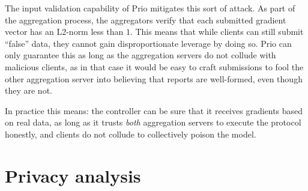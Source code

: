 \documentclass{article}
\begin{document}
The input validation capability of Prio mitigates this sort of attack.
As part of the aggregation process, the aggregators verify that each submitted gradient vector
has an L2-norm less than $1$. This means that while clients can still submit
``false'' data, they cannot gain disproportionate leverage by doing so. Prio can only
guarantee this as long as the aggregation servers do not collude with malicious
clients, as in that case it would be easy to craft submissions to fool the other
aggregation server into believing that reports are well-formed, even though they
are not.

In practice this means: the controller can be sure that it receives gradients
based on real data, as long as it trusts \textit{both} aggregation servers to
execute the protocol honestly, and clients do not collude to collectively poison the model.





\section{Privacy analysis}
\end{document}
